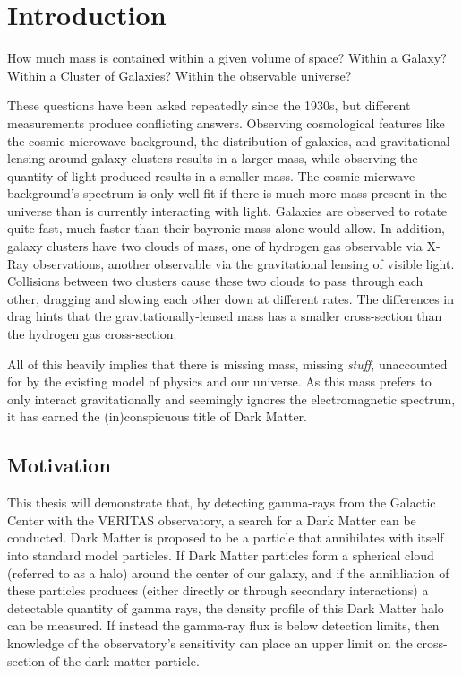 \cleartooddpage[\thispagestyle{empty}]
\chapter{Introduction}

  How much mass is contained within a given volume of space?
  Within a Galaxy?
  Within a Cluster of Galaxies?
  Within the observable universe?

  These questions have been asked repeatedly since the 1930s, but different measurements produce conflicting answers.
  Observing cosmological features like the cosmic microwave background, the distribution of galaxies, and gravitational lensing around galaxy clusters results in a larger mass, while observing the quantity of light produced results in a smaller mass.
  The cosmic micrwave background's spectrum is only well fit if there is much more mass present in the universe than is currently interacting with light.
  Galaxies are observed to rotate quite fast, much faster than their bayronic mass alone would allow.
  In addition, galaxy clusters have two clouds of mass, one of hydrogen gas observable via X-Ray observations, another observable via the gravitational lensing of visible light.
  Collisions between two clusters cause these two clouds to pass through each other, dragging and slowing each other down at different rates.
  The differences in drag hints that the gravitationally-lensed mass has a smaller cross-section than the hydrogen gas cross-section.
  
  All of this heavily implies that there is missing mass, missing \textit{stuff}, unaccounted for by the existing model of physics and our universe.
  As this mass prefers to only interact gravitationally and seemingly ignores the electromagnetic spectrum, it has earned the (in)conspicuous title of Dark Matter.

\section{Motivation}
  This thesis will demonstrate that, by detecting gamma-rays from the Galactic Center with the VERITAS observatory, a search for a Dark Matter can be conducted.
  Dark Matter is proposed to be a particle that annihilates with itself into standard model particles.
  If Dark Matter particles form a spherical cloud (referred to as a halo) around the center of our galaxy, and if the annihliation of these particles produces (either directly or through secondary interactions) a detectable quantity of gamma rays, the density profile of this Dark Matter halo can be measured.
  If instead the gamma-ray flux is below detection limits, then knowledge of the observatory's sensitivity can place an upper limit on the cross-section of the dark matter particle.

